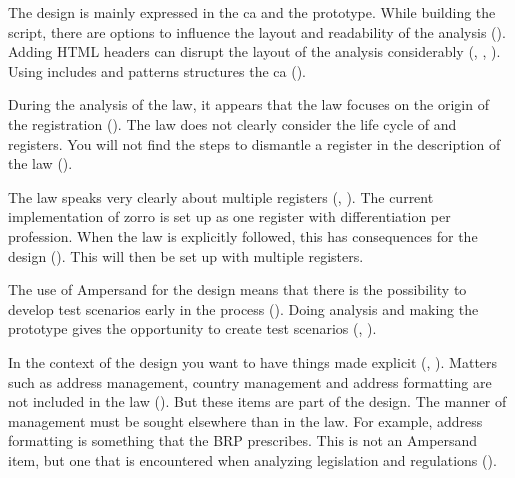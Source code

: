 The design is mainly expressed in the \acrlong{ca} and the prototype.
While building the script, there are options to influence the layout and readability of the analysis ().
Adding HTML headers can disrupt the layout of the analysis considerably (, , ).
Using includes and patterns structures the \acrlong{ca} ().

During the analysis of the law, it appears that the law focuses on the origin of the registration ().
The law does not clearly consider the life cycle of and registers.
You will not find the steps to dismantle a register in the description of the law ().

The law speaks very clearly about multiple registers (, ).
The current implementation of \acrshort{zorro} is set up as one register with differentiation per profession.
When the law is explicitly followed, this has consequences for the design ().
This will then be set up with multiple registers.

The use of Ampersand for the design means that there is the possibility to develop test scenarios early in the process ().
Doing analysis and making the prototype gives the opportunity to create test scenarios (, ).

In the context of the design you want to have things made explicit (, ).
Matters such as address management, country management and address formatting are not included in the law ().
But these items are part of the design.
The manner of management must be sought elsewhere than in the law.
For example, address formatting is something that the BRP prescribes.
This is not an Ampersand item, but one that is encountered when analyzing legislation and regulations ().

